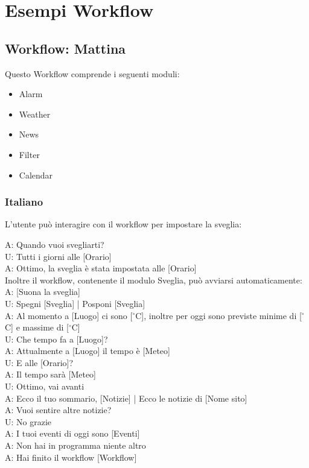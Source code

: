 \section{Esempi Workflow}
\subsection{Workflow: Mattina}
Questo Workflow comprende i seguenti moduli:
\begin{itemize}
	\item Alarm
	\item Weather
	\item News
	\item Filter
	\item Calendar
\end{itemize}

\subsubsection{Italiano}
L'utente può interagire con il workflow per impostare la sveglia:\\
\newline

A: Quando vuoi svegliarti?\\
U: Tutti i giorni alle [Orario]\\
A: Ottimo, la sveglia è stata impostata alle [Orario] \\

Inoltre il workflow, contenente il modulo Sveglia, può avviarsi automaticamente:\\
\newline
A: [Suona la sveglia]\\
U: Spegni [Sveglia] | Posponi [Sveglia]\\
A: Al momento a [Luogo] ci sono [$^\circ$C], inoltre per oggi sono previste minime di [$^\circ$C] e massime di [$^\circ$C]\\
U: Che tempo fa a [Luogo]?\\
A: Attualmente a [Luogo] il tempo è [Meteo]\\
U: E alle [Orario]?\\
A: Il tempo sarà [Meteo]\\
U: Ottimo, vai avanti\\
A: Ecco il tuo sommario, [Notizie] | Ecco le notizie di [Nome sito]\\
A: Vuoi sentire altre notizie?\\ 
U: No grazie\\
A: I tuoi eventi di oggi sono [Eventi]\\
A: Non hai in programma niente altro\\
A: Hai finito il workflow [Workflow]


